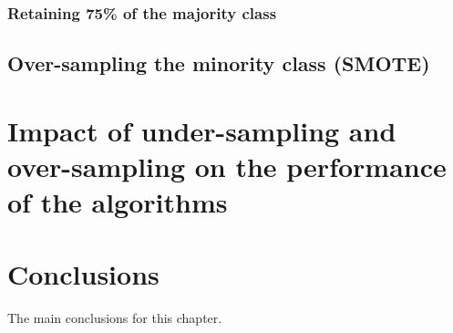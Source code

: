 \subsubsection{Retaining 75\% of the majority class}


\subsection{Over-sampling the minority class (SMOTE)}





\section{Impact of under-sampling and over-sampling on the performance of the algorithms}




 
\section{Conclusions}

The main conclusions for this chapter.


